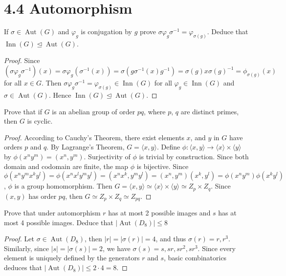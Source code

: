 \documentclass{article}
\newenvironment{problem}[2][Problem]{\begin{trivlist}
\item[\hskip \labelsep {\bfseries #1}\hskip \labelsep {\bfseries #2.}]}{\end{trivlist}}
\DeclareMathOperator{\Aut}{Aut}
\DeclareMathOperator{\Inn}{Inn}
\begin{document}
\section*{4.4 Automorphism}
\begin{problem}{1}
    If $\sigma \in \Aut(G)$ and $\varphi_g$ is conjugation by $g$ prove $\sigma \varphi_g\sigma^{-1}=\varphi_{\sigma(g)}$. Deduce that $\Inn(G)\trianglelefteq \Aut(G)$.
\end{problem}
\begin{proof}
    Since
    \[
    (\sigma\varphi_g\sigma^{-1})(x)=\sigma\varphi_g(\sigma^{-1}(x))=\sigma(g\sigma^{-1}(x)g^{-1})=\sigma(g)x\sigma(g)^{-1} = \phi_{\sigma(g)}(x)
    \]
    for all $x \in G$. Then $\sigma\varphi_g \sigma^{-1}=\varphi_{\sigma(g)}\in \Inn(G)$ for all $\varphi_g\in \Inn(G)$ and $\sigma\in \Aut(G)$. Hence $\Inn(G) \trianglelefteq \Aut(G)$.
\end{proof}
\begin{problem}{2}
    Prove that if $G$ is an abelian group of order $pq$, where $p$, $q$ are distinct primes, then $G$ is cyclic.
\end{problem}
\begin{proof}
    According to Cauchy's Theorem, there exist elements $x$, and $ y$ in $G$ have orders $p$ and $q$.
    By Lagrange's Theorem, $G=\langle x, y \rangle$. Define $\phi:\langle x, y \rangle \rightarrow \langle x \rangle \times \langle y \rangle$ by $\phi(x^ny^m)=(x^n, y^m)$. Surjectivity of $\phi$ is trivial by construction. Since both domain and codomain are finite, the map $\phi$ is bijective. Since \[     \phi(x^ny^mx^ky^l)=\phi(x^nx^ly^my^l)=(x^nx^k, y^my^l)=(x^n, y^m)(x^k, y^l)=\phi(x^ny^m)\phi(x^ky^l)     \], $\phi$ is a group homomorphism. Then $G=\langle x, y \rangle \simeq \langle x \rangle \times \langle y \rangle \simeq Z_p \times Z_q $. Since $(x, y)$ has order $pq$, then $G \simeq Z_p \times Z_q\simeq Z_{pq}$.
\end{proof}
\begin{problem}{3}
    Prove that under automorphism $r$ has at most 2 possible images and $s$ has at most 4 possible images. Deduce that $|\Aut(D_8)|\leq 8$
\end{problem}
\begin{proof}
    Let $\sigma\in \Aut(D_8)$, then $|r|=|\sigma(r)|=4$, and thus $\sigma(r)=r, r^3$. Similarly, since $|s|=|\sigma(s)|=2$, we have $\sigma(s)=s, sr, sr^2, sr^3$. Since every element is uniquely defined by the generators $r$ and $s$, basic combinatorics deduces that $|\Aut(D_8)|\leq 2 \cdot 4 =8$.
\end{proof}
\end{document}
